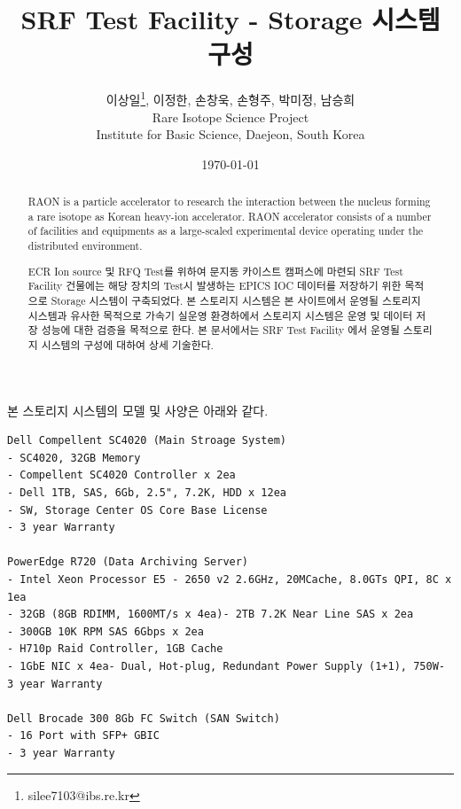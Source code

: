 \documentclass[11pt
  , a4paper
  , article
  , oneside
]{memoir}
\begin{document}
\newcommand{\technumber}{
  RAON Control-Document Series\\
  Revision : v1.0,   Release : 2015-03-16 fixed date}
\title{\textbf{SRF Test Facility - Storage 시스템 구성}}

\author{이상일\thanks{silee7103@ibs.re.kr}, 이정한, 손창욱, 손형주, 박미정, 남승희 \\

  Rare Isotope Science Project\\
  Institute for Basic Science, Daejeon, South Korea
}
\date{\today}

\renewcommand{\maketitlehooka}{\begin{flushright}\textsf{\technumber}\end{flushright}}

\maketitle

\begin{abstract}
RAON is a particle accelerator to research the interaction between the nucleus forming a rare isotope as Korean heavy-ion accelerator. RAON accelerator consists of a number of facilities and equipments as a large-scaled experimental device operating under the distributed environment. 

ECR Ion source 및 RFQ Test를 위하여 문지동 카이스트 캠퍼스에 마련되 SRF Test Facility 건물에는 해당 장치의 Test시 발생하는 EPICS IOC 데이터를 저장하기 위한 목적으로 Storage 시스템이 구축되었다. 본 스토리지 시스템은 본 사이트에서 운영될 스토리지 시스템과 유사한 목적으로 가속기 실운영 환경하에서 스토리지 시스템은 운영 및 데이터 저장 성능에 대한 검증을 목적으로 한다. 본 문서에서는 SRF Test Facility 에서 운영될 스토리지 시스템의 구성에 대하여 상세 기술한다.

\end{abstract}

본 스토리지 시스템의 모델 및 사양은 아래와 같다.

\begin{lstlisting}[style=termstyle]
Dell Compellent SC4020 (Main Stroage System)
- SC4020, 32GB Memory
- Compellent SC4020 Controller x 2ea
- Dell 1TB, SAS, 6Gb, 2.5", 7.2K, HDD x 12ea
- SW, Storage Center OS Core Base License
- 3 year Warranty

PowerEdge R720 (Data Archiving Server)
- Intel Xeon Processor E5 - 2650 v2 2.6GHz, 20MCache, 8.0GTs QPI, 8C x 1ea
- 32GB (8GB RDIMM, 1600MT/s x 4ea)- 2TB 7.2K Near Line SAS x 2ea
- 300GB 10K RPM SAS 6Gbps x 2ea
- H710p Raid Controller, 1GB Cache
- 1GbE NIC x 4ea- Dual, Hot-plug, Redundant Power Supply (1+1), 750W- 3 year Warranty

Dell Brocade 300 8Gb FC Switch (SAN Switch)
- 16 Port with SFP+ GBIC
- 3 year Warranty

\end{lstlisting}
\end{document}
